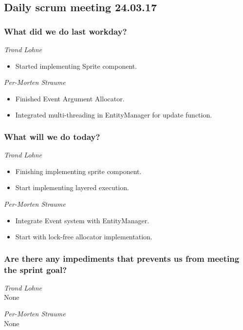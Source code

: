 \documentclass{article}
\begin{document}
\begin{center}
\subsection*{Daily scrum meeting 24.03.17}
\end{center}
\bigskip


\subsubsection*{What did we do last workday?}

\noindent\textit{Trond Lohne}
\begin{itemize}
	\item 
    Started implementing Sprite component.
\end{itemize}

\medskip

\noindent\textit{Per-Morten Straume}
\begin{itemize}
	\item 
	Finished Event Argument Allocator.
	
	\item 
	Integrated multi-threading in EntityManager for update function.
\end{itemize}


\subsubsection*{What will we do today?}

\noindent\textit{Trond Lohne}
\begin{itemize}
	\item 
	Finishing implementing sprite component.
	
	\item 
	Start implementing layered execution.
\end{itemize}

\medskip

\noindent\textit{Per-Morten Straume}
\begin{itemize}
	\item 
	Integrate Event system with EntityManager.
	
	\item 
	Start with lock-free allocator implementation.
\end{itemize}


\subsubsection*{Are there any impediments that prevents us from meeting the sprint goal?}

\noindent\textit{Trond Lohne}\\
None

\medskip

\noindent\textit{Per-Morten Straume}\\
None
\end{document}

